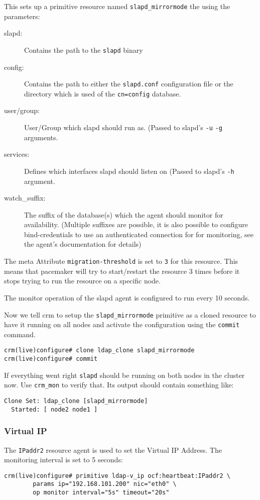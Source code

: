 \documentclass[a4paper,11pt,DIV=12]{scrartcl}
\begin{document}
    This sets up a primitive resource named \verb|slapd_mirrormode|
    the using the parameters:
    \begin{description}
        \item[slapd:]
            Contains the path to the \verb|slapd| binary
        \item[config:]
            Contains the path to either the \verb|slapd.conf| configuration
            file or the directory which is used of the \verb|cn=config|
            database.
        \item[user/group:]
            User/Group which slapd should run as. (Passed to slapd's \verb|-u|
            \verb|-g| arguments.
        \item[services:]
            Defines which interfaces slapd should listen on (Passed to slapd's
            \verb|-h| argument.
        \item[watch\_suffix:]
            The suffix of the database(s) which the agent should monitor for
            availability. (Multiple suffixes are possible, it is also possible
            to configure bind-credentials to use an authenticated connection for
            for monitoring, see the agent's documentation for details)
    \end{description}
    The meta Attribute \verb|migration-threshold| is set to \verb|3| for this
    resource. This means that pacemaker will try to start/restart
    the resource 3 times before it stops trying to run the resource on a
    specific node.

    The monitor operation of the slapd agent is configured to run every 10
    seconds.

    Now we tell crm to setup the \verb|slapd_mirrormode| primitive as
    a cloned resource to have it running on all nodes and activate the
    configuration using the \verb|commit| command.
    \begin{verbatim}
crm(live)configure# clone ldap_clone slapd_mirrormode
crm(live)configure# commit
    \end{verbatim}

    If everything went right \verb|slapd| should be running on both nodes
    in the cluster now. Use \verb|crm_mon| to verify that. Its output should
    contain something like:
    \begin{verbatim}
Clone Set: ldap_clone [slapd_mirrormode]
  Started: [ node2 node1 ]
    \end{verbatim}

\subsubsection{Virtual IP}
    The \verb|IPaddr2| resource agent is used to set the Virtual IP Address.
    The monitoring interval is set to 5 seconds:
    \begin{verbatim}
crm(live)configure# primitive ldap-v_ip ocf:heartbeat:IPaddr2 \
        params ip="192.168.101.200" nic="eth0" \
        op monitor interval="5s" timeout="20s"
    \end{verbatim}
\end{document}
